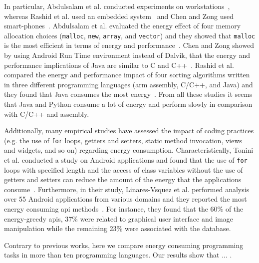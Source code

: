 In particular, Abdulsalam et al. conducted experiments on workstations~\cite{ALG14},
whereas Rashid et al. used an embedded system~\cite{RAT15} and
Chen and Zong used smart-phones~\cite{CZ16}.
Abdulsalam et al. evaluated the energy effect of four memory
allocation choices ({\tt malloc}, {\tt new}, {\tt array}, and {\tt vector})
and they showed that {\tt malloc} is the most efficient
in terms of energy and performance~\cite{ALG14}.
Chen and Zong showed by using Android Run Time
environment instead of Dalvik,
that the energy and performance implications of Java
are similar to C and C++~\cite{CZ16}.
Rashid et al. compared the energy and performance
impact of four sorting algorithms
written in three different programming languages
({\sc arm} assembly, C/C++, and Java) and
they found that Java consumes the most energy~\cite{RAT15}.
From all these studies it seems that
Java and Python consume a lot of energy and
perform slowly in comparison with C/C++ and assembly.

Additionally, many empirical studies have assessed the impact
of coding practices
(e.g. the use of {\tt for} loops, getters and setters,
static method invocation, views and widgets, and so on)
regarding energy consumption.
Characteristically,
Tonini et al. conducted a study on Android applications
and found that the use of {\tt for} loops with specified length
and the access of class variables without the use of getters and setters
can reduce the amount of the energy that
the applications consume~\cite{TFM13}.
Furthermore, 
in their study, Linares-Vsquez et al. performed analysis
over 55 Android applications from various domains
and they reported
the most energy consuming {\sc api} methods~\cite{LBB14}.
For instance, they found that
the 60\% of the energy-greedy {\sc api}s, 37\% were related to graphical user interface and
image manipulation while the remaining 23\% were associated with the database.

Contrary to previous works,
here we compare energy consuming programming tasks
in more than ten programming languages.
Our results show that ... . %